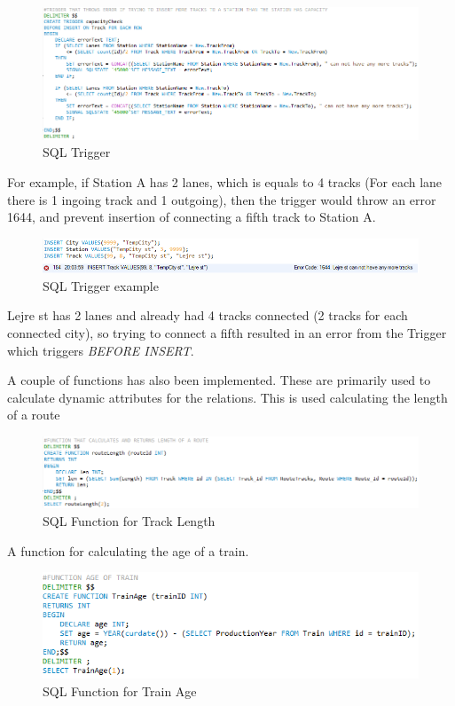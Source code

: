 \begin{figure}[ht!]
    \centering
    \includegraphics[width=1\textwidth]{img/SQL_TRIGGER}
    \caption{SQL Trigger}
\end{figure}

For example, if Station A has 2 lanes, which is equals to 4 tracks (For each 
lane there is 1 ingoing track and 1 outgoing), then the trigger would throw an 
error 1644, and prevent insertion of connecting a fifth track to Station A.

\begin{figure}[ht!]
    \centering
    \includegraphics[width=1\textwidth]{img/SQL_TRIGGER_example}
    \caption{SQL Trigger example}
\end{figure}

Lejre st has 2 lanes and already had 4 tracks connected (2 tracks for each 
connected city), so trying to connect a fifth resulted in an error from the 
Trigger which triggers \emph{BEFORE INSERT}.

A couple of functions has also been implemented. These are primarily used to 
calculate dynamic attributes for the relations.
This is used calculating the length of a route

\begin{figure}[ht!]
    \centering
    \includegraphics[width=1\textwidth]{img/SQL_FUNCTION_Length}
    \caption{SQL Function for Track Length}
\end{figure}

A function for calculating the age of a train.

\begin{figure}[ht!]
    \centering
    \includegraphics[width=1\textwidth]{img/SQL_FUNCTION_Age}
    \caption{SQL Function for Train Age}
\end{figure}

